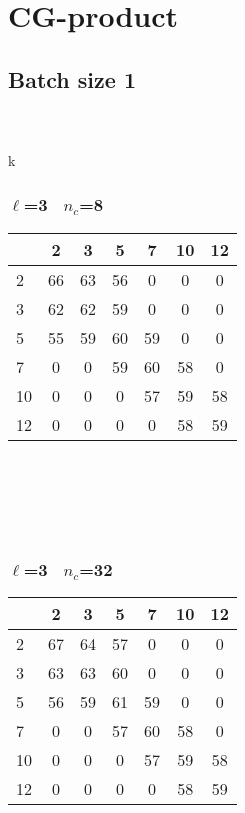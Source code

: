 \documentclass{article}
\begin{document}
\section*{CG-product}
\subsection*{Batch size 1}
\\ \\ 
k\subsubsection*{$\ell$=3~ $n_c$=8}\begin{tabular}{|l|c|c|c|c|c|c|}
\hline
&2&3&5&7&10&12\\
\hline
2&66&63&56&0&0&0\\
3&62&62&59&0&0&0\\
5&55&59&60&59&0&0\\
7&0&0&59&60&58&0\\
10&0&0&0&57&59&58\\
12&0&0&0&0&58&59\\
\hline
\end{tabular}
\\ 
\\ \\ \\ 
\subsubsection*{$\ell$=3~ $n_c$=32}\begin{tabular}{|l|c|c|c|c|c|c|}
\hline
&2&3&5&7&10&12\\
\hline
2&67&64&57&0&0&0\\
3&63&63&60&0&0&0\\
5&56&59&61&59&0&0\\
7&0&0&57&60&58&0\\
10&0&0&0&57&59&58\\
12&0&0&0&0&58&59\\
\hline
\end{tabular}
\\ 
\\ \\ \\ 
\end{document}
